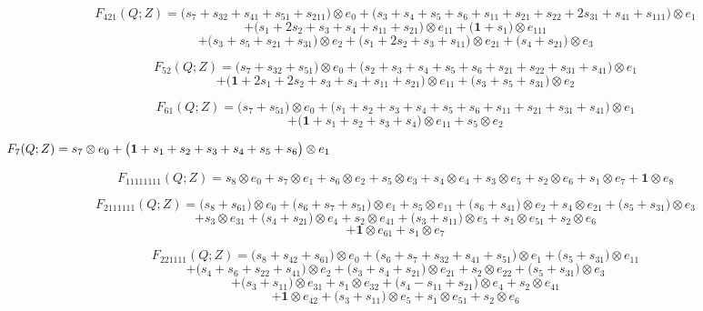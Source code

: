 \documentclass[12pt]{amsart}
\theoremstyle{plain}
\theoremstyle{definition}
\theoremstyle{remark}
\begin{document}
$$F_{ 421 }(Q;Z)=
\big( s_{7} + s_{32} + s_{41} + s_{51} + s_{211} \big) \otimes e_{ 0 }
+\big( s_{3} + s_{4} + s_{5} + s_{6} + s_{11} + s_{21} + s_{22} + 2 s_{31} + s_{41} + s_{111} \big) \otimes e_{ 1 } $$ $$
+\big( s_{1} + 2 s_{2} + s_{3} + s_{4} + s_{11} + s_{21} \big) \otimes e_{ 11 }
+\big( \boldsymbol{1} + s_{1} \big) \otimes e_{ 111 } $$ $$
+\big( s_{3} + s_{5} + s_{21} + s_{31} \big) \otimes e_{ 2 }
+\big( s_{1} + 2 s_{2} + s_{3} + s_{11} \big) \otimes e_{ 21 }
+\big( s_{4} + s_{21} \big) \otimes e_{ 3 }
$$

$$F_{ 52 }(Q;Z)=
\big( s_{7} + s_{32} + s_{51} \big) \otimes e_{ 0 }
+\big( s_{2} + s_{3} + s_{4} + s_{5} + s_{6} + s_{21} + s_{22} + s_{31} + s_{41} \big) \otimes e_{ 1 } $$ $$
+\big( \boldsymbol{1} + 2 s_{1} + 2 s_{2} + s_{3} + s_{4} + s_{11} + s_{21} \big) \otimes e_{ 11 }
+\big( s_{3} + s_{5} + s_{31} \big) \otimes e_{ 2 }
$$

$$F_{ 61 }(Q;Z)=
\big( s_{7} + s_{51} \big) \otimes e_{ 0 }
+\big( s_{1} + s_{2} + s_{3} + s_{4} + s_{5} + s_{6} + s_{11} + s_{21} + s_{31} + s_{41} \big) \otimes e_{ 1 } $$ $$
+\big( \boldsymbol{1} + s_{1} + s_{2} + s_{3} + s_{4} \big) \otimes e_{ 11 }
+ s_{5} \otimes e_{ 2 }
$$

$$F_{ 7 }(Q;Z)=
s_{7} \otimes e_{ 0 }
+\big( \boldsymbol{1} + s_{1} + s_{2} + s_{3} + s_{4} + s_{5} + s_{6} \big) \otimes e_{ 1 }
 \hskip 5in \  $$

$$F_{ 11111111 }(Q;Z)=
s_{8} \otimes e_{ 0 }
+ s_{7} \otimes e_{ 1 }
+ s_{6} \otimes e_{ 2 }
+ s_{5} \otimes e_{ 3 }
+ s_{4} \otimes e_{ 4 }
+ s_{3} \otimes e_{ 5 }
+ s_{2} \otimes e_{ 6 }
+ s_{1} \otimes e_{ 7 }
+ \boldsymbol{1} \otimes e_{ 8 }
$$

$$F_{ 2111111 }(Q;Z)=
\big( s_{8} + s_{61} \big) \otimes e_{ 0 }
+\big( s_{6} + s_{7} + s_{51} \big) \otimes e_{ 1 }
+ s_{5} \otimes e_{ 11 }
+\big( s_{6} + s_{41} \big) \otimes e_{ 2 }
+ s_{4} \otimes e_{ 21 }
+\big( s_{5} + s_{31} \big) \otimes e_{ 3 } $$ $$
+ s_{3} \otimes e_{ 31 } +\big( s_{4} + s_{21} \big) \otimes e_{ 4 }
+ s_{2} \otimes e_{ 41 }
+\big( s_{3} + s_{11} \big) \otimes e_{ 5 }
+ s_{1} \otimes e_{ 51 }
+ s_{2} \otimes e_{ 6 } $$ $$
+ \boldsymbol{1} \otimes e_{ 61 }
+ s_{1} \otimes e_{ 7 }
$$

$$F_{ 221111 }(Q;Z)=
\big( s_{8} + s_{42} + s_{61} \big) \otimes e_{ 0 }
+\big( s_{6} + s_{7} + s_{32} + s_{41} + s_{51} \big) \otimes e_{ 1 }
+\big( s_{5} + s_{31} \big) \otimes e_{ 11 } $$ $$
+\big( s_{4} + s_{6} + s_{22} + s_{41} \big) \otimes e_{ 2 }
+\big( s_{3} + s_{4} + s_{21} \big) \otimes e_{ 21 }
+ s_{2} \otimes e_{ 22 }
+\big( s_{5} + s_{31} \big) \otimes e_{ 3 } $$ $$
+\big( s_{3} + s_{11} \big) \otimes e_{ 31 }
+ s_{1} \otimes e_{ 32 }
+\big( s_{4} - s_{11} + s_{21} \big) \otimes e_{ 4 }
+ s_{2} \otimes e_{ 41 } $$ $$
+ \boldsymbol{1} \otimes e_{ 42 }
+\big( s_{3} + s_{11} \big) \otimes e_{ 5 }
+ s_{1} \otimes e_{ 51 }
+ s_{2} \otimes e_{ 6 }
$$
\end{document}
